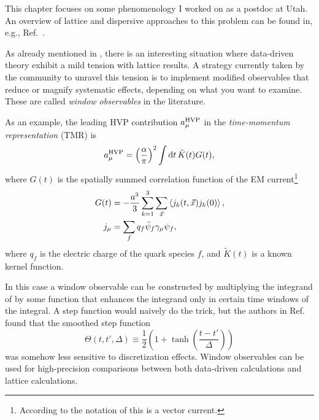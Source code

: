 This chapter focuses on some phenomenology I worked on as a postdoc at Utah.
An overview of lattice and dispersive approaches to this problem can
be found in, e.g., Ref.~\cite{aoyama_anomalous_2020}.

As already mentioned in , there is an interesting situation
where data-driven theory exhibit a mild tension with lattice results.
A strategy currently taken by the community to unravel this tension is to
implement modified observables that reduce or magnify systematic effects,
depending on what you want to examine. These are called {\it window observables}
in the literature.

As an example, the leading HVP contribution $a_\mu^{\rm HVP}$ in the
{\it time-momentum representation} (TMR) is~\cite{bernecker_vector_2011}
\begin{equation}\label{eq:amuhvp}
  a_\mu^{\rm HVP}=\left(\frac{\alpha}{\pi}\right)^2\int\dd{t}\tilde{K}(t)G(t),
\end{equation}
where $G(t)$ is the spatially summed correlation function of the EM 
current\footnote{According to the notation of 
this is a vector current.}
\begin{equation}\begin{aligned}
  G(t) &=-\frac{a^3}{3}\sum_{k=1}^3\sum_{\vec{x}}\ev{j_k(t,\vec{x})j_k(0)},\\
  j_\mu&=\sum_fq_f\bar{\psi}_f\gamma_\mu\psi_f,
\end{aligned}\end{equation}
where $q_f$ is the electric charge of the quark species $f$,
and $\tilde{K}(t)$ is a known kernel function.

In this case a window observable
can be constructed by multiplying the integrand of  by some
function that enhances the integrand only in certain time windows of the
integral. A step function would naively do the trick, but the authors
in Ref.~\cite{blum_calculation_2018} found that the smoothed step function
\begin{equation}
  \Theta(t,t',\Delta)\equiv\frac{1}{2}\left(1+\tanh\left(\frac{t-t'}{\Delta}\right)\right)
\end{equation}
was somehow less sensitive to discretization effects.
Window observables can be used for high-precision comparisons between both
data-driven calculations and lattice calculations.



